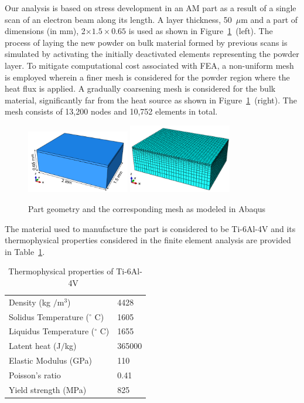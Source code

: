 Our analysis is based on stress development in an AM part as a result of a single scan of an 
electron beam along its
length. A layer thickness, 50~$\mu$m and a part of dimensions (in mm), 2$\times 1.5\times 0.65$ is used as shown
in Figure~\ref{fig:PartwMesh}~(left). 
The process of laying the new powder on bulk material formed by previous scans is simulated 
by activating the initially deactivated elements representing the powder layer. To mitigate computational cost
associated with FEA, a non-uniform mesh is employed wherein a finer mesh is considered for the powder
region where the heat flux is applied. A gradually coarsening mesh is considered for the bulk material, significantly far 
from the heat source as shown in Figure~\ref{fig:PartwMesh}~(right). The mesh consists of 13,200 nodes and 
10,752 elements in total. 
%
\begin{figure}[htbp]
\begin{center}
\includegraphics[width=0.4\textwidth]{./Figures/EBM_PartwXYZ} 
\includegraphics[width=0.4\textwidth]{./Figures/meshwXYZ}
\end{center}
\caption{Part geometry and the corresponding mesh as modeled in Abaqus}
\label{fig:PartwMesh}
\end{figure}
%
The material used to manufacture the part is considered to be Ti-6Al-4V and its
thermophysical properties considered in the finite element analysis are provided in Table~\ref{tab:matProp}.
%
\begin{table}[htbp]
\centering
\caption{Thermophysical properties of Ti-6Al-4V~\cite{Fu:2014}}
\label{tab:matProp}
\vspace{1mm}
\begin{tabular}{ ll }
\toprule
    Density (kg $/$m$^3$) & 4428\\
    Solidus Temperature ($^\circ$ C) & 1605 \\
    Liquidus Temperature ($^\circ$ C) & 1655\\
    Latent heat (J$/$kg) & 365000\\
    Elastic Modulus (GPa) & 110 \\
    Poisson's ratio & 0.41\\
    Yield strength (MPa) & 825\\
\bottomrule
\end{tabular}
\end{table}

